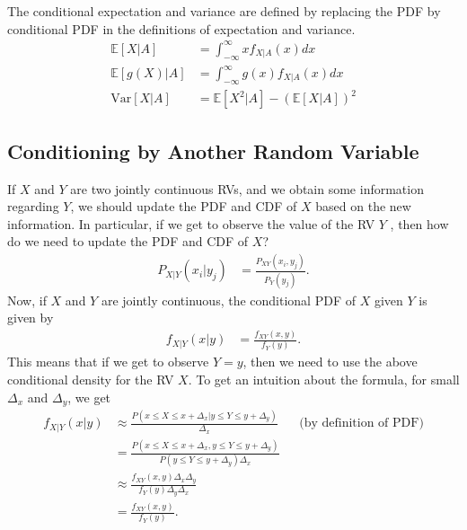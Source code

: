The conditional expectation and variance are defined by replacing the PDF by conditional PDF in the definitions of expectation and variance. 
\begin{align*}
	\mathbb{E}[X|A] &= \int_{-\infty}^{\infty}xf_{X|A}(x)dx\\
	\mathbb{E}[g(X)|A]	&= \int_{-\infty}^{\infty}g(x)f_{X|A}(x)dx\\
	\text{Var}[X|A]	&=\mathbb{E}[X^2|A]-\left(\mathbb{E}[X|A]\right)^2
\end{align*}

\subsection{Conditioning by Another Random Variable}

If $X$ and $Y$ are two jointly continuous RVs, and we obtain some information regarding $Y$, we should update the PDF and CDF of $X$ based on the new information. In particular, if we get to observe the value of the RV $Y$ , then how do we need to update the PDF and CDF of $X$?
\begin{align*}
	P_{X|Y}(x_i|y_j)&= \frac{P_{XY}(x_i,y_j)}{P_Y(y_j)}.
\end{align*}
Now, if $X$ and $Y$ are jointly continuous, the conditional PDF of $X$ given $Y$ is given by
\begin{align*}
	f_{X|Y}(x|y)&= \frac{f_{XY}(x,y)}{f_Y(y)}.
\end{align*}
This means that if we get to observe $Y=y$, then we need to use the above conditional density for the RV $X$. To get an intuition about the formula, for small $\Delta_x$ and $\Delta_y$, we get
\begin{align*}
	 f_{X|Y}(x|y) &\approx \frac{P(x \leq X \leq x+\Delta_x | y \leq Y \leq y+\Delta_y)}{\Delta_x} \hspace{20pt} \textrm{(by definition of PDF)}\\
	 &=\frac{P(x \leq X \leq x+\Delta_x , y \leq Y \leq y+\Delta_y)}{P(y \leq Y \leq y+\Delta_y) \Delta_x}\\
	 &\approx \frac{f_{XY}(x,y) \Delta_x \Delta_y}{f_Y(y) \Delta_y \Delta_x}\\
	 &=\frac{f_{XY}(x,y)}{f_Y(y)}.
\end{align*}

